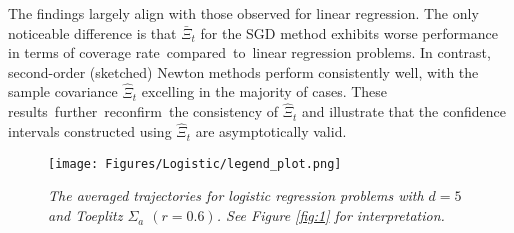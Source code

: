 The findings largely align with those observed for linear regression. The only noticeable difference is that $\bar{\Xi}_t$ for the SGD method exhibits worse performance in terms of coverage rate~compared~to~linear regression problems. In contrast, second-order (sketched) Newton methods perform consistently well, with the sample covariance $\hat{\Xi}_t$ excelling in the majority of cases. These results~\mbox{further}~\mbox{reconfirm}~the consistency of $\hat{\Xi}_t$ and illustrate that the confidence intervals constructed using $\hat{\Xi}_t$ are asymptotically valid.


	
\begin{figure}[!t]
\centering   
{}
\vskip5pt
	
\vskip5pt

\vskip5pt
\vskip5pt
\texttt{[image: Figures/Logistic/legend\_plot.png]}
\caption{\textit{The averaged trajectories for logistic regression problems with $d=5$ and Toeplitz $\Sigma_a$ $(r=0.6)$. See Figure \ref{fig:1} for interpretation.}}\label{fig:2}
\end{figure}




